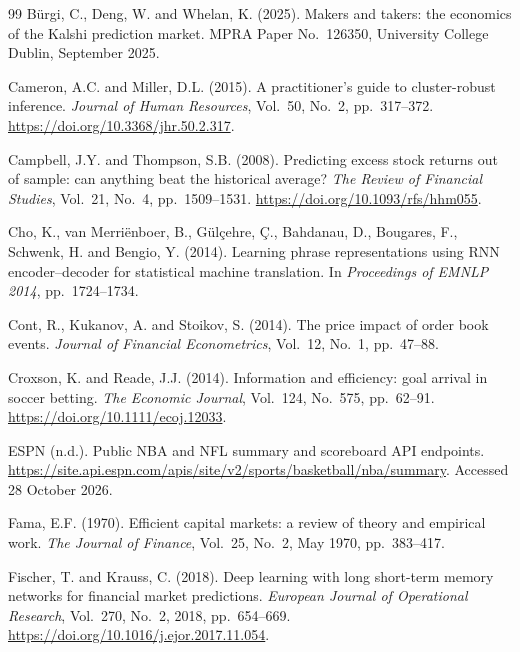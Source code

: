 \documentclass[12pt,a4paper,oneside]{report}
\begin{document}
\begin{thebibliography}{99}
B\"urgi, C., Deng, W. and Whelan, K. (2025). Makers and takers: the economics of
the Kalshi prediction market. MPRA Paper No.~126350, University College Dublin,
September 2025.

Cameron, A.C. and Miller, D.L. (2015). A practitioner's guide to cluster-robust
inference. \textit{Journal of Human Resources}, Vol.~50, No.~2, pp.~317--372.
\url{https://doi.org/10.3368/jhr.50.2.317}.

Campbell, J.Y. and Thompson, S.B. (2008). Predicting excess stock returns out of
sample: can anything beat the historical average? \textit{The Review of Financial
Studies}, Vol.~21, No.~4, pp.~1509--1531.
\url{https://doi.org/10.1093/rfs/hhm055}.

Cho, K., van Merri\"enboer, B., G\"ul\c{c}ehre, \c{C}., Bahdanau, D.,
Bougares, F., Schwenk, H. and Bengio, Y. (2014). Learning phrase representations
using RNN encoder--decoder for statistical machine translation. In
\textit{Proceedings of EMNLP 2014}, pp.~1724--1734.

Cont, R., Kukanov, A. and Stoikov, S. (2014). The price impact of order book events.
\textit{Journal of Financial Econometrics}, Vol.~12, No.~1, pp.~47--88.

Croxson, K. and Reade, J.J. (2014). Information and efficiency: goal arrival in
soccer betting. \textit{The Economic Journal}, Vol.~124, No.~575, pp.~62--91.
\url{https://doi.org/10.1111/ecoj.12033}.

ESPN (n.d.). Public NBA and NFL summary and scoreboard API endpoints.
\url{https://site.api.espn.com/apis/site/v2/sports/basketball/nba/summary}.
Accessed 28 October 2026.

Fama, E.F. (1970). Efficient capital markets: a review of theory and empirical
work. \textit{The Journal of Finance}, Vol.~25, No.~2, May 1970, pp.~383--417.

Fischer, T. and Krauss, C. (2018). Deep learning with long short-term memory
networks for financial market predictions. \textit{European Journal of
Operational Research}, Vol.~270, No.~2, 2018, pp.~654--669.
\url{https://doi.org/10.1016/j.ejor.2017.11.054}.


\end{thebibliography}
\end{document}
